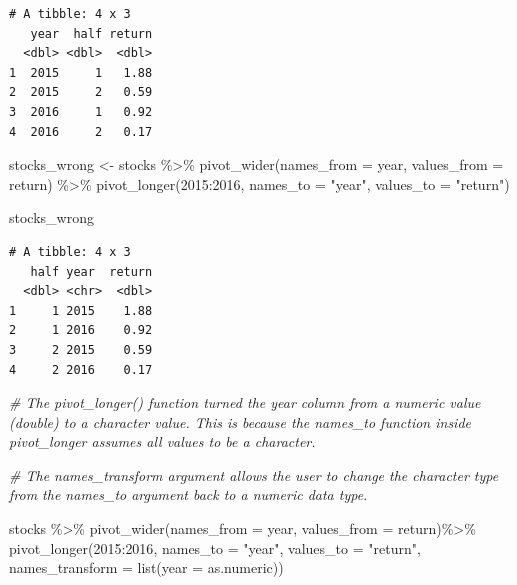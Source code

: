 \documentclass[
]{article}
\newenvironment{Shaded}{\begin{snugshade}}{\end{snugshade}}
\newcommand{\AttributeTok}[1]{\textcolor[rgb]{0.77,0.63,0.00}{#1}}
\newcommand{\CommentTok}[1]{\textcolor[rgb]{0.56,0.35,0.01}{\textit{#1}}}
\newcommand{\FunctionTok}[1]{\textcolor[rgb]{0.00,0.00,0.00}{#1}}
\newcommand{\NormalTok}[1]{#1}
\newcommand{\OtherTok}[1]{\textcolor[rgb]{0.56,0.35,0.01}{#1}}
\newcommand{\SpecialCharTok}[1]{\textcolor[rgb]{0.00,0.00,0.00}{#1}}
\newcommand{\StringTok}[1]{\textcolor[rgb]{0.31,0.60,0.02}{#1}}
\begin{document}
\begin{verbatim}
# A tibble: 4 x 3
   year  half return
  <dbl> <dbl>  <dbl>
1  2015     1   1.88
2  2015     2   0.59
3  2016     1   0.92
4  2016     2   0.17
\end{verbatim}

\begin{Shaded}
\begin{Highlighting}[]
\NormalTok{stocks\_wrong }\OtherTok{\textless{}{-}}\NormalTok{ stocks }\SpecialCharTok{\%\textgreater{}\%} 
  \FunctionTok{pivot\_wider}\NormalTok{(}\AttributeTok{names\_from =}\NormalTok{ year, }\AttributeTok{values\_from =}\NormalTok{ return) }\SpecialCharTok{\%\textgreater{}\%} 
  \FunctionTok{pivot\_longer}\NormalTok{(}\StringTok{\textasciigrave{}}\AttributeTok{2015}\StringTok{\textasciigrave{}}\SpecialCharTok{:}\StringTok{\textasciigrave{}}\AttributeTok{2016}\StringTok{\textasciigrave{}}\NormalTok{, }\AttributeTok{names\_to =} \StringTok{"year"}\NormalTok{, }\AttributeTok{values\_to =} \StringTok{"return"}\NormalTok{)}

\NormalTok{stocks\_wrong}
\end{Highlighting}
\end{Shaded}

\begin{verbatim}
# A tibble: 4 x 3
   half year  return
  <dbl> <chr>  <dbl>
1     1 2015    1.88
2     1 2016    0.92
3     2 2015    0.59
4     2 2016    0.17
\end{verbatim}

\begin{Shaded}
\begin{Highlighting}[]
\CommentTok{\# The pivot\_longer() function turned the year column from a numeric value (double) to a character value. This is because the \textquotesingle{}names\_to\textquotesingle{} function inside pivot\_longer assumes all values to be a character. }

\CommentTok{\# The \textquotesingle{}names\_transform\textquotesingle{} argument allows the user to change the character type from the \textquotesingle{}names\_to\textquotesingle{} argument back to a numeric data type.}

\NormalTok{stocks }\SpecialCharTok{\%\textgreater{}\%}
  \FunctionTok{pivot\_wider}\NormalTok{(}\AttributeTok{names\_from =}\NormalTok{ year, }\AttributeTok{values\_from =}\NormalTok{ return)}\SpecialCharTok{\%\textgreater{}\%}
  \FunctionTok{pivot\_longer}\NormalTok{(}\StringTok{\textasciigrave{}}\AttributeTok{2015}\StringTok{\textasciigrave{}}\SpecialCharTok{:}\StringTok{\textasciigrave{}}\AttributeTok{2016}\StringTok{\textasciigrave{}}\NormalTok{, }\AttributeTok{names\_to =} \StringTok{"year"}\NormalTok{, }\AttributeTok{values\_to =} \StringTok{"return"}\NormalTok{, }\AttributeTok{names\_transform =} \FunctionTok{list}\NormalTok{(}\AttributeTok{year =}\NormalTok{ as.numeric))}
\end{Highlighting}
\end{Shaded}
\end{document}
